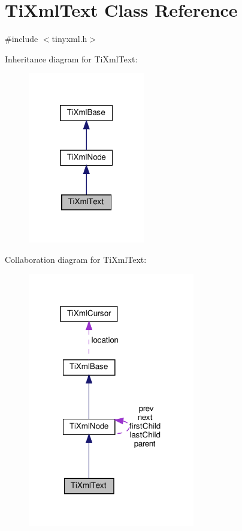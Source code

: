 \hypertarget{classTiXmlText}{}\section{Ti\+Xml\+Text Class Reference}
\label{classTiXmlText}


{\ttfamily \#include $<$tinyxml.\+h$>$}



Inheritance diagram for Ti\+Xml\+Text\+:
\nopagebreak
\begin{figure}[H]
\begin{center}
\leavevmode
\includegraphics[width=145pt]{classTiXmlText__inherit__graph}
\end{center}
\end{figure}


Collaboration diagram for Ti\+Xml\+Text\+:
\nopagebreak
\begin{figure}[H]
\begin{center}
\leavevmode
\includegraphics[width=206pt]{classTiXmlText__coll__graph}
\end{center}
\end{figure}
